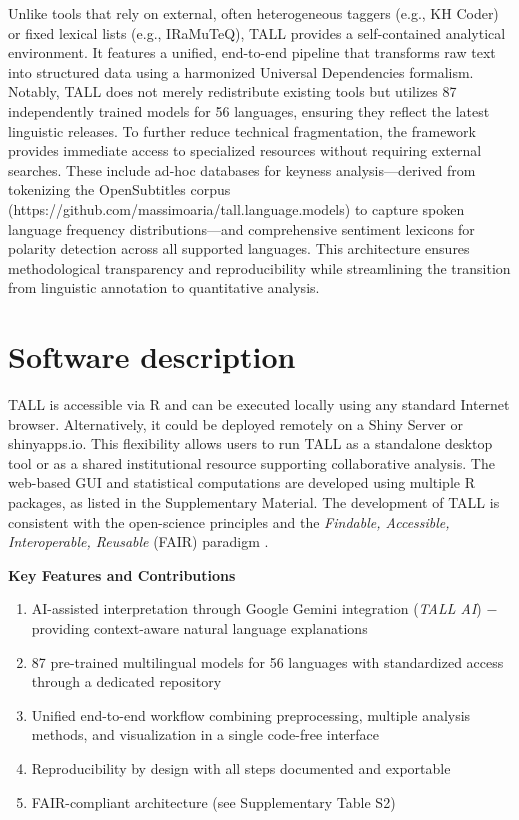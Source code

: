 \documentclass[preprint,12pt,a4paper]{elsarticle}
\begin{document}
Unlike tools that rely on external, often heterogeneous taggers (e.g., KH Coder) or fixed lexical lists (e.g., IRaMuTeQ), TALL provides a self-contained analytical environment. It features a unified, end-to-end pipeline that transforms raw text into structured data using a harmonized Universal Dependencies formalism. Notably, TALL does not merely redistribute existing tools but utilizes 87 independently trained models for 56 languages, ensuring they reflect the latest linguistic releases. To further reduce technical fragmentation, the framework provides immediate access to specialized resources without requiring external searches. These include ad-hoc databases for keyness analysis—derived from tokenizing the OpenSubtitles corpus (https://github.com/massimoaria/tall.language.models) to capture spoken language frequency distributions—and comprehensive sentiment lexicons for polarity detection across all supported languages. This architecture ensures methodological transparency and reproducibility while streamlining the transition from linguistic annotation to quantitative analysis.

\section{Software description}
TALL is accessible via \textsf{R} and can be executed locally using any standard Internet browser. Alternatively, it could be deployed remotely on a Shiny Server or \textsf{shinyapps.io}. This flexibility allows users to run TALL as a standalone desktop tool or as a shared institutional resource supporting collaborative analysis. The web-based GUI and statistical computations are developed using multiple \textsf{R} packages, as listed in the Supplementary Material. The development of TALL is consistent with the open-science principles and the \textit{Findable, Accessible, Interoperable, Reusable} (FAIR) paradigm \cite{wil16}.

\begin{highlightbox}
\footnotesize
\noindent\textbf{Key Features and Contributions}
\begin{enumerate}
    \item AI-assisted interpretation through Google Gemini integration (\textit{TALL AI}) $-$ providing context-aware natural language explanations
    \item 87 pre-trained multilingual models for 56 languages with standardized access through a dedicated repository
    \item Unified end-to-end workflow combining preprocessing, multiple analysis methods, and visualization in a single code-free interface
    \item Reproducibility by design with all steps documented and exportable
    \item FAIR-compliant architecture (see Supplementary Table S2)
\end{enumerate}
\end{highlightbox}
\end{document}
